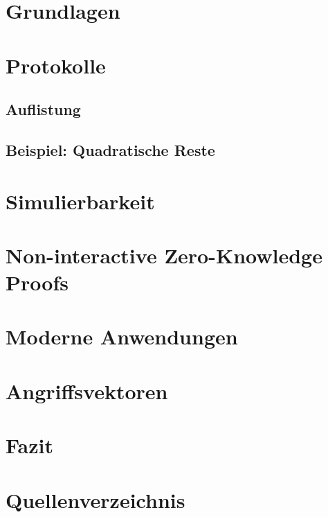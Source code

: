 \documentclass {article}
\begin{document}
\section{Grundlagen}
\section{Protokolle}
\subsection{Auflistung}
\subsection{Beispiel: Quadratische Reste}
\section{Simulierbarkeit}
\section{Non-interactive Zero-Knowledge Proofs}
\section{Moderne Anwendungen}
\section{Angriffsvektoren}
\section{Fazit}
\section{Quellenverzeichnis}

\nocite{BG89}
\nocite{BM89}
\nocite{GMIR85}
\nocite{GO90}
\nocite{KZKP}
\nocite{PrSa14}
\nocite{RS91}
\nocite{Wik1}
\nocite{Wik2}

\printbibliography


  
\end{document}
